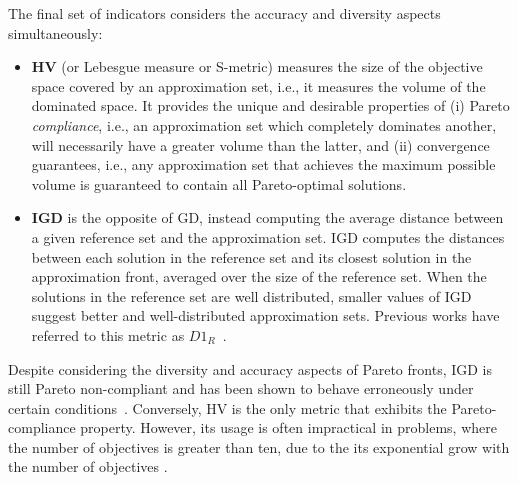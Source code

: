	The final set of indicators considers the accuracy and diversity aspects simultaneously:
	\begin{itemize}
		\item \textbf{\ac{HV}} (or Lebesgue measure or S-metric) measures the size of the objective space covered by an approximation set, i.e., it measures the volume of the dominated space. It provides the unique and desirable properties of (i) Pareto \textit{compliance}, i.e., an approximation set which completely dominates another, will necessarily have a greater volume than the latter, and (ii) convergence guarantees, i.e., any approximation set that achieves the maximum possible volume is guaranteed to contain all Pareto-optimal solutions.
		\item \textbf{\ac{IGD}} is the opposite of \ac{GD}, instead computing the average distance between a given reference set and the approximation set. \ac{IGD} computes the distances between each solution in the reference set and its closest solution in the approximation front, averaged over the size of the reference set. When the solutions in the reference set are well distributed, smaller values of \ac{IGD} suggest better and well-distributed approximation sets. Previous works have referred to this metric as \textbf{$D1_R$}~\cite{Ishibuchi2005GDIGD}. 
	\end{itemize}
	
	Despite considering the diversity and accuracy aspects of Pareto fronts, \ac{IGD} is still Pareto non-compliant and has been shown to behave erroneously under certain conditions~\cite{Ishibuchi2005GDIGD}. Conversely, \ac{HV} is the only metric that exhibits the Pareto-compliance property. However, its usage is often impractical in problems, where the number of objectives is greater than ten, due to the its exponential grow with the number of objectives \cite{Ishibuchi2005GDIGD}.
	
	

